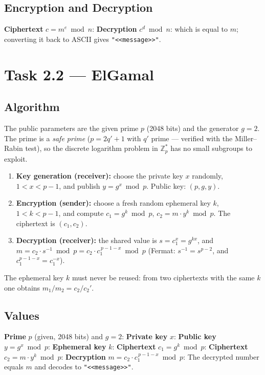 \documentclass[12pt,a4paper]{article}
\begin{document}
\subsection{Encryption and Decryption}
\noindent\textbf{Ciphertext} $c = m^{e} \bmod n$:
\noindent\textbf{Decryption} $c^{d} \bmod n$:
which is equal to $m$; converting it back to ASCII gives \texttt{"<<message>>"}.

\section{Task 2.2 — ElGamal}
\subsection{Algorithm}
The public parameters are the given prime $p$ (2048 bits) and the generator $g=2$. The prime is a
\emph{safe prime} ($p=2q'+1$ with $q'$ prime — verified with the Miller–Rabin test), so the
discrete logarithm problem in $\mathbb{Z}_p^*$ has no small subgroups to exploit.
\begin{enumerate}
  \item \textbf{Key generation (receiver):} choose the private key $x$ randomly,
        $1 < x < p-1$, and publish $y = g^{x} \bmod p$. Public key: $(p,g,y)$.
  \item \textbf{Encryption (sender):} choose a fresh random ephemeral key $k$, $1<k<p-1$, and
        compute
        $c_1 = g^{k} \bmod p$, \; $c_2 = m\cdot y^{k} \bmod p$. The ciphertext is $(c_1,c_2)$.
  \item \textbf{Decryption (receiver):} the shared value is $s=c_1^{x}=g^{kx}$, and
        $m = c_2 \cdot s^{-1} \bmod p = c_2 \cdot c_1^{\,p-1-x} \bmod p$ (Fermat: $s^{-1}=s^{p-2}$,
        and $c_1^{p-1-x}=c_1^{-x}$).
\end{enumerate}
The ephemeral key $k$ must never be reused: from two ciphertexts with the same $k$ one obtains
$m_1/m_2 = c_2/c_2'$.

\subsection{Values}
\noindent\textbf{Prime} $p$ (given, 2048 bits) and $g = 2$:
\noindent\textbf{Private key} $x$:
\noindent\textbf{Public key} $y = g^{x} \bmod p$:
\noindent\textbf{Ephemeral key} $k$:
\noindent\textbf{Ciphertext} $c_1 = g^{k} \bmod p$:
\noindent\textbf{Ciphertext} $c_2 = m \cdot y^{k} \bmod p$:
\noindent\textbf{Decryption} $m = c_2 \cdot c_1^{\,p-1-x} \bmod p$:
The decrypted number equals $m$ and decodes to \texttt{"<<message>>"}.
\end{document}
